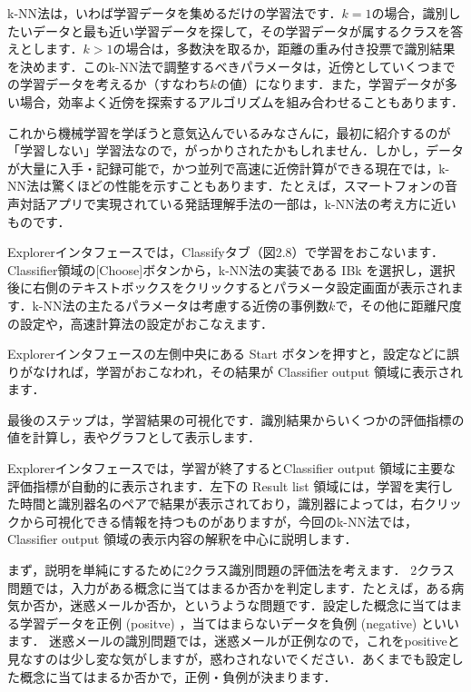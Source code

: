 
k-NN法は，いわば学習データを集めるだけの学習法です．$k=1$の場合，識別したいデータと最も近い学習データを探して，その学習データが属するクラスを答えとします．$k>1$の場合は，多数決を取るか，距離の重み付き投票で識別結果を決めます．このk-NN法で調整するべきパラメータは，近傍としていくつまでの学習データを考えるか（すなわち$k$の値）になります．また，学習データが多い場合，効率よく近傍を探索するアルゴリズムを組み合わせることもあります．

これから機械学習を学ぼうと意気込んでいるみなさんに，最初に紹介するのが「学習しない」学習法なので，がっかりされたかもしれません．しかし，データが大量に入手・記録可能で，かつ並列で高速に近傍計算ができる現在では，k-NN法は驚くほどの性能を示すこともあります．たとえば，スマートフォンの音声対話アプリで実現されている発話理解手法の一部は，k-NN法の考え方に近いものです．


Explorerインタフェースでは，Classifyタブ（図2.8）で学習をおこないます．Classifier領域の[Choose]ボタンから，k-NN法の実装である IBk を選択し，選択後に右側のテキストボックスをクリックするとパラメータ設定画面が表示されます．k-NN法の主たるパラメータは考慮する近傍の事例数$k$で，その他に距離尺度の設定や，高速計算法の設定がおこなえます．

Explorerインタフェースの左側中央にある Start ボタンを押すと，設定などに誤りがなければ，学習がおこなわれ，その結果が Classifier output 領域に表示されます．


最後のステップは，学習結果の可視化です．識別結果からいくつかの評価指標の値を計算し，表やグラフとして表示します．


Explorerインタフェースでは，学習が終了するとClassifier output 領域に主要な評価指標が自動的に表示されます．左下の Result list 領域には，学習を実行した時間と識別器名のペアで結果が表示されており，識別器によっては，右クリックから可視化できる情報を持つものがありますが，今回のk-NN法では， Classifier output 領域の表示内容の解釈を中心に説明します．


まず，説明を単純にするために2クラス識別問題の評価法を考えます．
2クラス問題では，入力がある概念に当てはまるか否かを判定します．たとえば，ある病気か否か，迷惑メールか否か，というような問題です．設定した概念に当てはまる学習データを正例 (positve) ，当てはまらないデータを負例 (negative) といいます．
迷惑メールの識別問題では，迷惑メールが正例なので，これをpositiveと見なすのは少し変な気がしますが，惑わされないでください．あくまでも設定した概念に当てはまるか否かで，正例・負例が決まります．

